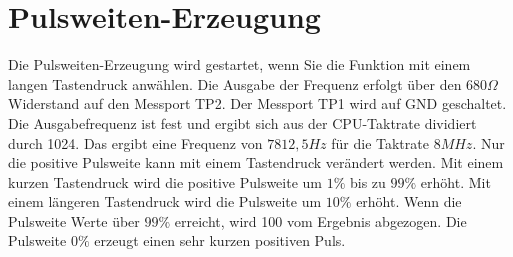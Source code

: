 \section{Pulsweiten-Erzeugung}
Die Pulsweiten-Erzeugung wird gestartet, wenn Sie die Funktion  mit einem
langen Tastendruck anwählen.
Die Ausgabe der Frequenz erfolgt über den \(680\Omega\) Widerstand auf den Messport TP2.
Der Messport TP1 wird auf GND geschaltet.
Die Ausgabefrequenz ist fest und ergibt sich aus der CPU-Taktrate dividiert durch 1024.
Das ergibt eine Frequenz von \(7812,5Hz\) für die Taktrate \(8MHz\).
Nur die positive Pulsweite kann mit einem Tastendruck verändert werden. Mit einem
kurzen Tastendruck wird die positive Pulsweite um \(1\%\) bis zu \(99\%\) erhöht.
Mit einem längeren Tastendruck wird die Pulsweite um \(10\%\) erhöht.
Wenn die Pulsweite Werte über \(99\%\) erreicht, wird 100 vom Ergebnis abgezogen.
Die Pulsweite \(0\%\) erzeugt einen sehr kurzen positiven Puls.

